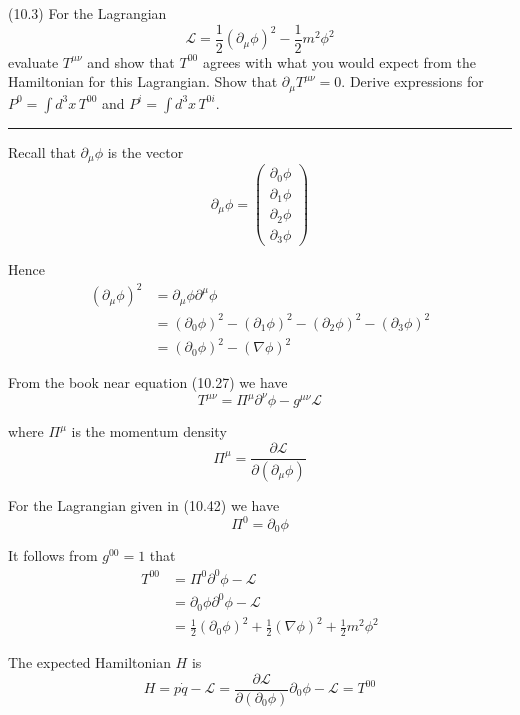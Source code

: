 \documentclass[12pt]{article}
\begin{document}
(10.3)
For the Lagrangian
\begin{equation*}
\mathcal L=\frac{1}{2}(\partial_\mu\phi)^2-\frac{1}{2}m^2\phi^2
\tag{10.42}
\end{equation*}
evaluate $T^{\mu\nu}$ and show that $T^{00}$ agrees with what
you would expect from the Hamiltonian for this Lagrangian.
Show that $\partial_\mu T^{\mu\nu}=0$. Derive expressions
for $P^0=\int d^3x\,T^{00}$ and $P^i=\int d^3x\,T^{0i}$.

\bigskip
\hrule

\bigskip
Recall that $\partial_\mu\phi$ is the vector
\begin{equation*}
\partial_\mu\phi=\begin{pmatrix}
\partial_0\phi
\\
\partial_1\phi
\\
\partial_2\phi
\\
\partial_3\phi
\end{pmatrix}
\end{equation*}

Hence
\begin{align*}
(\partial_\mu\phi)^2
&=\partial_\mu\phi\partial^\mu\phi
\\
&=(\partial_0\phi)^2-(\partial_1\phi)^2-(\partial_2\phi)^2-(\partial_3\phi)^2
\\
&=(\partial_0\phi)^2-(\nabla\phi)^2
\end{align*}

From the book near equation (10.27) we have
\begin{equation*}
T^{\mu\nu}=\Pi^\mu\partial^\nu\phi-g^{\mu\nu}\mathcal L
\end{equation*}

where $\Pi^\mu$ is the momentum density
\begin{equation*}
\Pi^\mu=\frac{\partial\mathcal L}{\partial(\partial_\mu\phi)}
\end{equation*}

For the Lagrangian given in (10.42) we have
\begin{equation*}
\Pi^0=\partial_0\phi
\end{equation*}

It follows from $g^{00}=1$ that
\begin{align*}
T^{00}
&=\Pi^0\partial^0\phi-\mathcal L
\\
&=\partial_0\phi\partial^0\phi-\mathcal L
\\
&=\frac{1}{2}(\partial_0\phi)^2+\frac{1}{2}(\nabla\phi)^2+\frac{1}{2}m^2\phi^2
\end{align*}

The expected Hamiltonian $H$ is
\begin{equation*}
H=p\dot q-\mathcal L
=\frac{\partial\mathcal L}{\partial(\partial_0\phi)}\partial_0\phi-\mathcal L
=T^{00}
\end{equation*}
\end{document}

